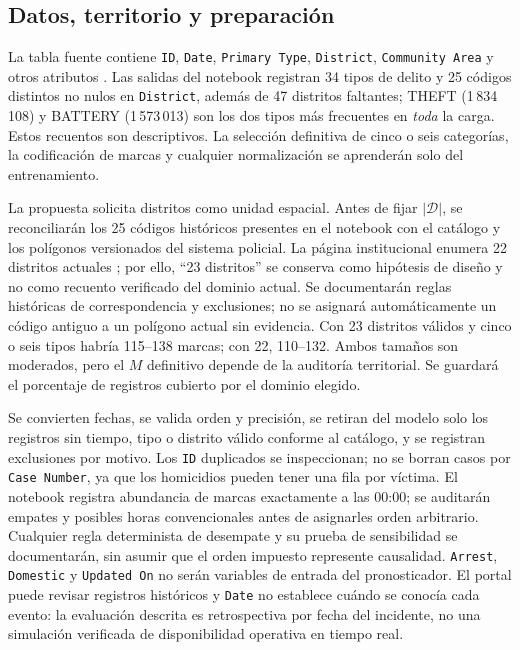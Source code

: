 \documentclass[10pt,a4paper,twocolumn]{article}
\newcommand{\campo}[1]{\texttt{#1}}
\begin{document}
\subsection{Datos, territorio y preparación}
La tabla fuente contiene \campo{ID}, \campo{Date}, \campo{Primary Type}, \campo{District}, \campo{Community Area} y otros atributos \cite{chicagoCrimes}. Las salidas del notebook registran 34 tipos de delito y 25 códigos distintos no nulos en \campo{District}, además de 47 distritos faltantes; THEFT (1\,834\,108) y BATTERY (1\,573\,013) son los dos tipos más frecuentes en \emph{toda} la carga. Estos recuentos son descriptivos. La selección definitiva de cinco o seis categorías, la codificación de marcas y cualquier normalización se aprenderán solo del entrenamiento.

La propuesta solicita distritos como unidad espacial. Antes de fijar $|\mathcal D|$, se reconciliarán los 25 códigos históricos presentes en el notebook con el catálogo y los polígonos versionados del sistema policial. La página institucional enumera 22 distritos actuales \cite{cpdDistricts}; por ello, ``23 distritos'' se conserva como hipótesis de diseño y no como recuento verificado del dominio actual. Se documentarán reglas históricas de correspondencia y exclusiones; no se asignará automáticamente un código antiguo a un polígono actual sin evidencia. Con 23 distritos válidos y cinco o seis tipos habría 115--138 marcas; con 22, 110--132. Ambos tamaños son moderados, pero el $M$ definitivo depende de la auditoría territorial. Se guardará el porcentaje de registros cubierto por el dominio elegido.

Se convierten fechas, se valida orden y precisión, se retiran del modelo solo los registros sin tiempo, tipo o distrito válido conforme al catálogo, y se registran exclusiones por motivo. Los \campo{ID} duplicados se inspeccionan; no se borran casos por \campo{Case Number}, ya que los homicidios pueden tener una fila por víctima. El notebook registra abundancia de marcas exactamente a las 00:00; se auditarán empates y posibles horas convencionales antes de asignarles orden arbitrario. Cualquier regla determinista de desempate y su prueba de sensibilidad se documentarán, sin asumir que el orden impuesto represente causalidad. \campo{Arrest}, \campo{Domestic} y \campo{Updated On} no serán variables de entrada del pronosticador. El portal puede revisar registros históricos y \campo{Date} no establece cuándo se conocía cada evento: la evaluación descrita es retrospectiva por fecha del incidente, no una simulación verificada de disponibilidad operativa en tiempo real.
\end{document}
